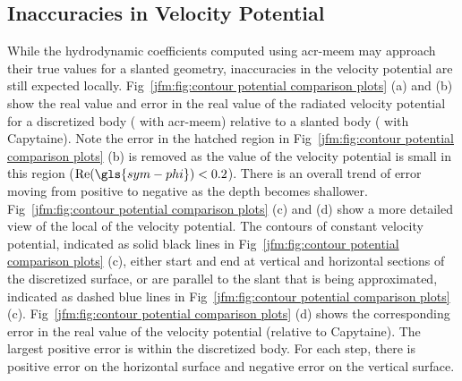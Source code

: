 \documentclass[ASNA,twocolumn]{USG} %
\begin{document}
\subsection{Inaccuracies in Velocity Potential} While the hydrodynamic coefficients computed using \gls{acr-meem} may approach their true values for a slanted geometry, inaccuracies in the velocity potential are still expected locally.
Fig~\ref{jfm:fig:contour potential comparison plots} (a) and (b) show the real value and error in the real value of the radiated velocity potential for a discretized body (\modelled{} with \gls{acr-meem}) relative to a slanted body (\modelled{} with Capytaine).
Note the error in the hatched region in Fig~\ref{jfm:fig:contour potential comparison plots} (b) is removed as the value of the velocity potential is small in this region ($\mathrm{Re}(\gls{sym-phi})<0.2$).
There is an overall trend of error moving from positive to negative as the depth becomes shallower.
Fig~\ref{jfm:fig:contour potential comparison plots} (c) and (d) show a more detailed view of the local \behaviour{} of the velocity potential.
The contours of constant velocity potential, indicated as solid black lines in Fig~\ref{jfm:fig:contour potential comparison plots} (c), either start and end at vertical and horizontal sections of the discretized surface, or are parallel to the slant that is being approximated, indicated as dashed blue lines in Fig~\ref{jfm:fig:contour potential comparison plots} (c).
Fig~\ref{jfm:fig:contour potential comparison plots} (d) shows the corresponding error in the real value of the velocity potential (relative to Capytaine).
The largest positive error is within the discretized body.
For each step, there is positive error on the horizontal surface and negative error on the vertical surface. 
\end{document}
